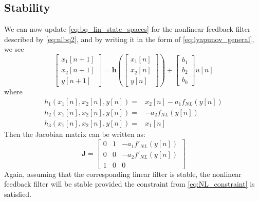 \documentclass{IEEEtran}
\begin{document}
\subsection{Stability}
%
We can now update \cref{eq:bq_lin_state_spaces} for the nonlinear
feedback filter described by \cref{eq:nlbq2}, and by writing it in the form
of \cref{eq:lyapunov_general}, we see
%
\begin{equation}
    \begin{bmatrix} x_1[n+1] \\ x_2[n+1] \\ y[n+1] \end{bmatrix} =
    \mathbf{h} \left( \begin{bmatrix} x_1[n] \\ x_2[n] \\ y[n] \end{bmatrix}
    \right) + \begin{bmatrix} b_1\\ b_2\\ b_0 \end{bmatrix} u[n]
    \label{eq:nlbq2_states}
\end{equation}
%
where
%
\begin{equation}
    \begin{split}
        h_1(x_1[n], x_2[n], y[n]) =& x_2[n] - a_1f_{NL}(y[n]) \\
        h_2(x_1[n], x_2[n], y[n]) =& -a_2f_{NL}(y[n]) \\
        h_3(x_1[n], x_2[n], y[n]) =& x_1[n]
    \end{split}
    \label{eq:nlbq2_state_eqns2}
\end{equation}
%
Then the Jacobian matrix can be written as:
%
\begin{equation}
    \mathbf{J} = \begin{bmatrix}
        0& 1& -a_1f'_{NL}(y[n]) \\
        0& 0& -a_2f'_{NL}(y[n]) \\
        1& 0& 0
    \end{bmatrix}
    \label{eq:nlbq2_Jacobian}
\end{equation}
%
Again, assuming that the corresponding linear filter is stable, the
nonlinear feedback filter will be stable provided the constraint
from \cref{eq:NL_constraint} is satisfied.
%
\end{document}
